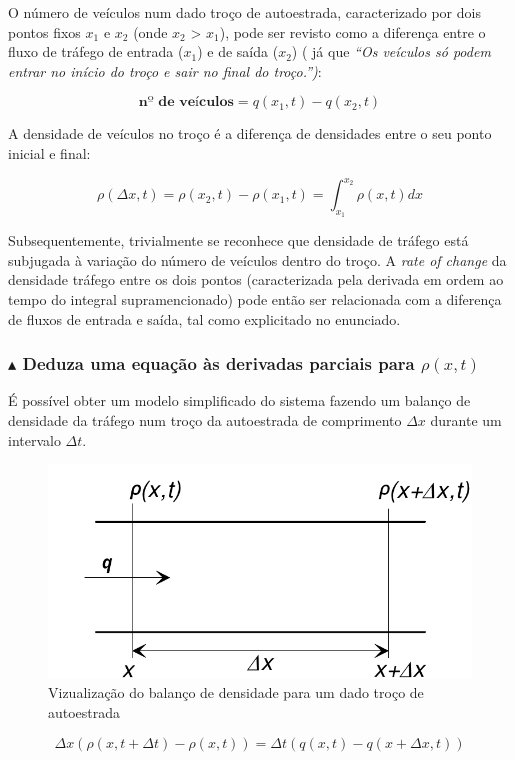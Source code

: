 \noindent O número de veículos num dado troço de autoestrada, caracterizado por dois pontos fixos $x_1$ e $x_2$ (onde $x_2$ > $x_1$), pode ser revisto como a diferença entre o fluxo de tráfego de entrada ($x_1$) e de saída ($x_2$) ( já que \textit{``Os veículos só podem entrar no início do troço e sair no final do troço.'')}:

$$
    \textbf{nº de veículos} = q(x_1,t) - q(x_2,t)
$$

\noindent A densidade de veículos no troço é a diferença de densidades entre o seu ponto inicial e final:

$$
    \rho(\Delta x, t) = \rho(x_2, t) - \rho(x_1, t) = \int_{x_1}^{x_2}\rho (x,t)dx
$$

\noindent Subsequentemente, trivialmente se reconhece que densidade de tráfego está subjugada à variação do número de veículos dentro do troço. A \textit{rate of change} da densidade tráfego entre os dois pontos (caracterizada pela derivada em ordem ao tempo do integral supramencionado) pode então ser relacionada com a diferença de fluxos de entrada e saída, tal como explicitado no enunciado.

\clearpage
\subsubsection*{$\blacktriangle$ Deduza uma equação às derivadas parciais para $\rho(x,t)$}

É possível obter um modelo simplificado do sistema fazendo um balanço de densidade da tráfego num troço da autoestrada de comprimento $\Delta x$ durante um intervalo $\Delta t$.

\vspace{-0.75em}
\begin{figure}[H]
    \centering
    \includegraphics[width = 0.5\linewidth]{img/applied-dif-equ/fluxo-veiculo.png}
    \caption{Vizualização do balanço de densidade para um dado troço de autoestrada}
    \label{fig:fluxoV}
\end{figure}
\vspace{-1.5em}
$$
    \Delta x (\rho(x, t + \Delta t) - \rho(x, t)) = \Delta t (q(x,t) - q(x + \Delta x,t))
$$

